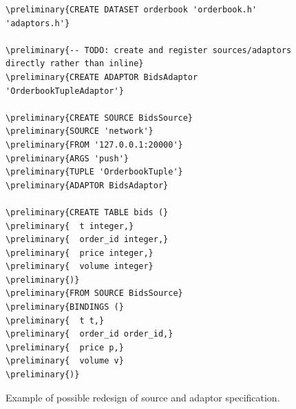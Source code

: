 \documentclass[14pt]{article}
\newcommand{\preliminary}[1]{\textcolor{prelim}{#1}}
\newcommand{\comment}[1]{}
\begin{document}
\begin{figure}[htbp]
\begin{Verbatim}[commandchars=\\\{\}]
\preliminary{CREATE DATASET orderbook 'orderbook.h' 'adaptors.h'}

\preliminary{-- TODO: create and register sources/adaptors directly rather than inline}
\preliminary{CREATE ADAPTOR BidsAdaptor 'OrderbookTupleAdaptor'}

\preliminary{CREATE SOURCE BidsSource}
\preliminary{SOURCE 'network'}
\preliminary{FROM '127.0.0.1:20000'}
\preliminary{ARGS 'push'}
\preliminary{TUPLE 'OrderbookTuple'}
\preliminary{ADAPTOR BidsAdaptor}

\preliminary{CREATE TABLE bids (}
\preliminary{  t integer,}
\preliminary{  order_id integer,}
\preliminary{  price integer,}
\preliminary{  volume integer}
\preliminary{)}
\preliminary{FROM SOURCE BidsSource}
\preliminary{BINDINGS (}
\preliminary{  t t,}
\preliminary{  order_id order_id,}
\preliminary{  price p,}
\preliminary{  volume v}
\preliminary{)}
\end{Verbatim}
\caption{Example of possible redesign of source and adaptor specification.}
\label{fig:source-sql-spec-redesigned}
\end{figure}

\comment{
Compiler consists of several components. Its structure can be seen in figure
\ref{CompilerPicture}. The main functionality of Compiler is to receive SQL
queries and Data Adaptors from users. When they are compiled, Compiler adds them
to Sources Processor or Query Processor respectively.

Two components responsible for compilation are SQL query pre-compiler and C++ code compiler. 

Compiler is an initial point of interaction with the DBToaster Runtime. Once
Runtime is up and running users initiate contact by specifying their need to
execute a query on some specific set of data sources or a desire to add an
update stream. User query and requests to add Data Adaptors are received by User
Input Handler. When Input Handler collects all needed informations, it is passed
to Compiler Admin. Compiler Admin converts SQL queries to C++ code and C++ code
to binary format. Compiled queries are passed to Query Admin to be added to a
list of actively executed queries. Data Source streams (Readers) are added by a
user providing a Data Adaptor for each stream. When Data Adaptor code is
compiled and user specified Reader is created, both are passed to Data Sources
Admin to be added to the list of active Readers. Reader and Adaptor for that
Reader form a pair where Reader receives data and Adaptor converts it to a
format understandable by Query Executor.

The Data Adapter is compiled into a binary format and sent to Data Sources Admin
to be added to Data Adaptors.
}
\end{document}
